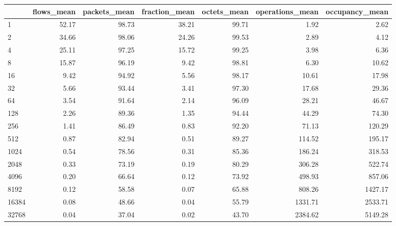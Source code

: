 \begin{tabular}{lrrrrrr}
\toprule
{} &  flows\_mean &  packets\_mean &  fraction\_mean &  octets\_mean &  operations\_mean &  occupancy\_mean \\
\midrule
1        &       52.17 &         98.73 &          38.21 &        99.71 &             1.92 &            2.62 \\
2        &       34.66 &         98.06 &          24.26 &        99.53 &             2.89 &            4.12 \\
4        &       25.11 &         97.25 &          15.72 &        99.25 &             3.98 &            6.36 \\
8        &       15.87 &         96.19 &           9.42 &        98.81 &             6.30 &           10.62 \\
16       &        9.42 &         94.92 &           5.56 &        98.17 &            10.61 &           17.98 \\
32       &        5.66 &         93.44 &           3.41 &        97.30 &            17.68 &           29.36 \\
64       &        3.54 &         91.64 &           2.14 &        96.09 &            28.21 &           46.67 \\
128      &        2.26 &         89.36 &           1.35 &        94.44 &            44.29 &           74.30 \\
256      &        1.41 &         86.49 &           0.83 &        92.20 &            71.13 &          120.29 \\
512      &        0.87 &         82.94 &           0.51 &        89.27 &           114.52 &          195.17 \\
1024     &        0.54 &         78.56 &           0.31 &        85.36 &           186.24 &          318.53 \\
2048     &        0.33 &         73.19 &           0.19 &        80.29 &           306.28 &          522.74 \\
4096     &        0.20 &         66.64 &           0.12 &        73.92 &           498.93 &          857.06 \\
8192     &        0.12 &         58.58 &           0.07 &        65.88 &           808.26 &         1427.17 \\
16384    &        0.08 &         48.66 &           0.04 &        55.79 &          1331.71 &         2533.71 \\
32768    &        0.04 &         37.04 &           0.02 &        43.70 &          2384.62 &         5149.28 \\

\end{tabular}
